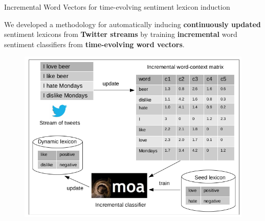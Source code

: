\documentclass[handout]{beamer}
\begin{document}
\begin{frame}{Incremental Word Vectors for time-evolving sentiment lexicon induction}
\begin{scriptsize}

 We developed a methodology for automatically inducing \textbf{continuously updated} sentiment lexicons from \textbf{Twitter streams} by training \textbf{incremental} word sentiment classifiers from \textbf{time-evolving word vectors}. \cite{bravo2021incremental}
  \begin{figure}[h]
        	\includegraphics[scale = 0.35]{pics/incdiagram.png}
        \end{figure}

\end{scriptsize}
\end{frame}
\end{document}
